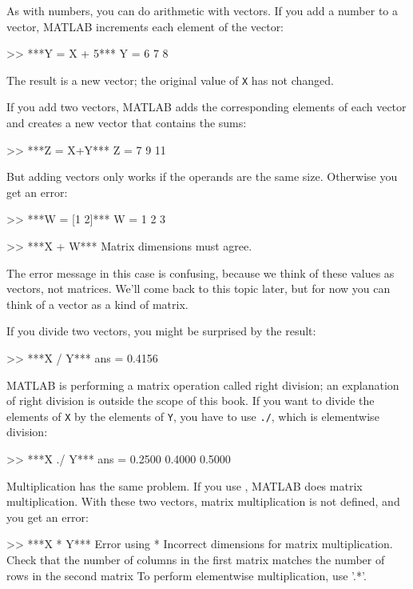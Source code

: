 As with numbers, you can do arithmetic with vectors.  If you add a number
to a vector, MATLAB increments each element of the vector:

\begin{code}
>> ***Y = X + 5***
Y = 6     7     8
\end{code}

\noindent The result is a new vector; the original value of {\tt X} has not
changed.

If you add two vectors, MATLAB adds the corresponding elements of each
vector and creates a new vector that contains the sums:

\begin{code}
>> ***Z = X+Y***
Z = 7     9    11
\end{code}

But adding vectors only works if the operands are the same size.
Otherwise you get an error:

\begin{code}
>> ***W = [1 2]***
W = 1     2     3

>> ***X + W***
Matrix dimensions must agree.
\end{code}

\noindent The error message in this case is confusing, because we think of these values as vectors, not matrices.
We'll come back to this topic later, but for now you can think of a vector as a kind of matrix.


If you divide two vectors, you might be surprised by the result:

\begin{code}
>> ***X / Y***
ans = 0.4156
\end{code}

MATLAB is performing a matrix operation called right division; an explanation of right division is outside the scope of this book. If you want to divide the elements of {\tt X} by the elements of {\tt Y}, you have to use {\tt ./}, which is elementwise division:

\begin{code}
>> ***X ./ Y***
ans = 0.2500    0.4000    0.5000
\end{code}

Multiplication has the same problem.  If you use {\tt *}, MATLAB does matrix multiplication.  With these two vectors, matrix multiplication is not defined, and you get an error:

\begin{code}
>> ***X * Y***
Error using  * 
Incorrect dimensions for matrix multiplication. 
Check that the number of columns in the first matrix 
matches the number of rows in the second matrix
To perform elementwise multiplication, use '.*'.
\end{code}

